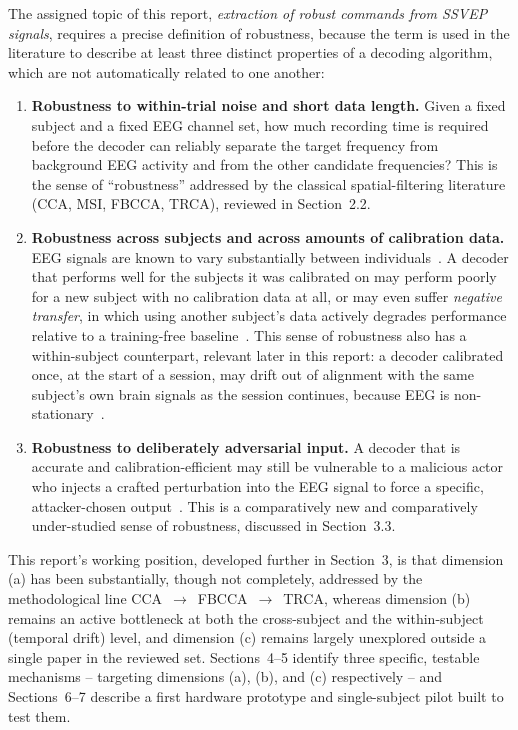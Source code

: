 \documentclass[11pt]{article}
\begin{document}
The assigned topic of this report, \emph{extraction of robust commands from SSVEP signals}, requires a precise definition of robustness, because the term is used in the literature to describe at least three distinct properties of a decoding algorithm, which are not automatically related to one another:

\begin{enumerate}[label=(\alph*)]
  \item \textbf{Robustness to within-trial noise and short data length.} Given a fixed subject and a fixed EEG channel set, how much recording time is required before the decoder can reliably separate the target frequency from background EEG activity and from the other candidate frequencies? This is the sense of ``robustness'' addressed by the classical spatial-filtering literature (CCA, MSI, FBCCA, TRCA), reviewed in Section~2.2.

  \item \textbf{Robustness across subjects and across amounts of calibration data.} EEG signals are known to vary substantially between individuals~\cite{zerafa2018train}. A decoder that performs well for the subjects it was calibrated on may perform poorly for a new subject with no calibration data at all, or may even suffer \emph{negative transfer}, in which using another subject's data actively degrades performance relative to a training-free baseline~\cite{li2024sutl}. This sense of robustness also has a within-subject counterpart, relevant later in this report: a decoder calibrated once, at the start of a session, may drift out of alignment with the same subject's own brain signals as the session continues, because EEG is non-stationary~\cite{nicolasalonso2012bci}.

  \item \textbf{Robustness to deliberately adversarial input.} A decoder that is accurate and calibration-efficient may still be vulnerable to a malicious actor who injects a crafted perturbation into the EEG signal to force a specific, attacker-chosen output~\cite{bian2022squarewave}. This is a comparatively new and comparatively under-studied sense of robustness, discussed in Section~3.3.
\end{enumerate}

This report's working position, developed further in Section~3, is that dimension (a) has been substantially, though not completely, addressed by the methodological line CCA~$\rightarrow$~FBCCA~$\rightarrow$~TRCA, whereas dimension (b) remains an active bottleneck at both the cross-subject and the within-subject (temporal drift) level, and dimension (c) remains largely unexplored outside a single paper in the reviewed set. Sections~4--5 identify three specific, testable mechanisms -- targeting dimensions (a), (b), and (c) respectively -- and Sections~6--7 describe a first hardware prototype and single-subject pilot built to test them.
\end{document}
